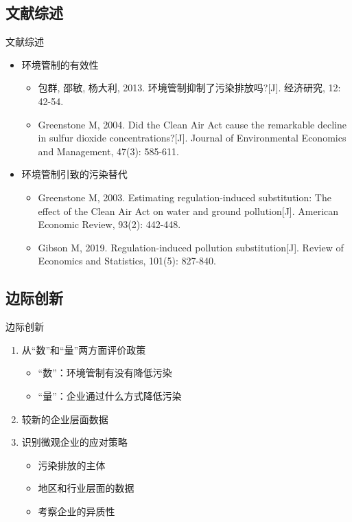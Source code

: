 \documentclass[11pt,compress,xcolor=x11names,UTF8]{beamer}
\begin{document}
\subsection{文献综述}
	\begin{frame}{文献综述}
		\begin{itemize}
			\item 环境管制的有效性
			\begin{itemize}
				\item 包群, 邵敏, 杨大利, 2013. 环境管制抑制了污染排放吗?[J]. 经济研究, 12: 42-54.
				\item {\rmfamily Greenstone M, 2004. Did the Clean Air Act cause the remarkable decline in sulfur dioxide concentrations?[J]. Journal of Environmental Economics and Management, 47(3): 585-611.}
			\end{itemize}
			
			\item 环境管制引致的污染替代
			\begin{itemize}
				\item  {\rmfamily Greenstone M, 2003. Estimating regulation-induced substitution: The effect of the Clean Air Act on water and ground pollution[J]. American Economic Review, 93(2): 442-448.}
				\item  {\rmfamily Gibson M, 2019. Regulation-induced pollution substitution[J]. Review of Economics and Statistics, 101(5): 827-840.}
			\end{itemize}
		\end{itemize}
	\end{frame}
\subsection{边际创新}
	\begin{frame}{边际创新}
		\begin{enumerate}
			\item 从``数''和``量''两方面评价政策
			\begin{itemize}
				\item ``数''：环境管制有没有降低污染
				\item ``量''：企业通过什么方式降低污染
			\end{itemize}
			\item 较新的企业层面数据
			\item 识别微观企业的应对策略
			\begin{itemize}
				\item 污染排放的主体
				\item 地区和行业层面的数据
				\item 考察企业的异质性
			\end{itemize}
		\end{enumerate}

	\end{frame}
\end{document}
